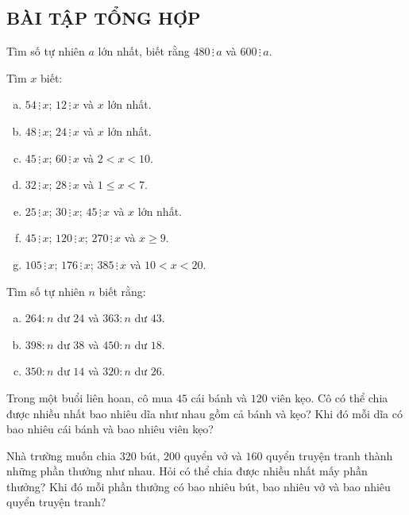 \begin{bt}
\subsection{BÀI TẬP TỔNG HỢP}
\end{bt}   \begin{bt}
Tìm số tự nhiên $a$ lớn nhất, biết rằng $480 \,\vdots \,a$ và $600\, \vdots \, a$.
\end{bt}   \begin{bt} 
Tìm $x$ biết:
\begin{enumerate}[a)]
\item $54 \,\vdots\,  x$; $12 \,\vdots\, x$ và $x$ lớn nhất.
\item $48\, \vdots \, x$; $24 \,\vdots \,x$ và $x$ lớn nhất.
\item $45 \,\vdots\,  x$; $60\, \vdots \,x$ và $2 < x < 10$.
\item $32 \,\vdots \, x$; $28 \,\vdots \,x$ và $1 \le x < 7$.
\item $25 \,\vdots  \,x$; $30\, \vdots \,x$; $45 \,\vdots \,x$ và $x$ lớn nhất.
\item $45 \,\vdots  \,x$; $120 \,\vdots\, x$; $270 \,\vdots \,x$ và $x \ge 9$.
\item $105 \,\vdots \, x$; $176 \,\vdots\, x$; $385 \,\vdots \,x$ và $10 < x < 20$.
\end{enumerate}
\end{bt}   \begin{bt} 
Tìm số tự nhiên $n$ biết rằng:
\begin{enumerate}[a)]
\item $264 : n$ dư $24$ và $363 : n$ dư $43$.
\item $398 : n$ dư $38$ và $450 : n$ dư $18$.
\item $350 : n$ dư $14$ và $320 : n$ dư $26$.
\end{enumerate}
\end{bt}   \begin{bt}
Trong một buổi liên hoan, cô  mua $45$ cái bánh và $120$ viên kẹo. Cô có thể chia được nhiều nhất bao nhiêu dĩa như nhau gồm cả bánh và kẹo? Khi đó mỗi dĩa có bao nhiêu cái bánh và bao nhiêu viên kẹo?
\end{bt}   \begin{bt}
Nhà trường muốn chia $320$ bút, $200$ quyển vở  và $160$ quyển truyện tranh thành những phần thưởng như nhau. Hỏi có thể chia được nhiều nhất mấy phần thưởng? Khi đó mỗi phần thưởng có bao nhiêu bút, bao nhiêu vở và bao nhiêu quyển truyện tranh?
\end{bt}   \begin{bt}

\end{bt}
